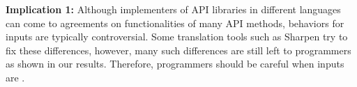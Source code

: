 
\textbf{Implication 1:} Although implementers of API libraries in different languages can come to agreements on functionalities of many API methods, behaviors for  inputs are typically controversial. Some translation tools such as Sharpen try to fix these differences, however, many such differences are still left to programmers as shown in our results. Therefore, programmers should be careful when inputs are .

